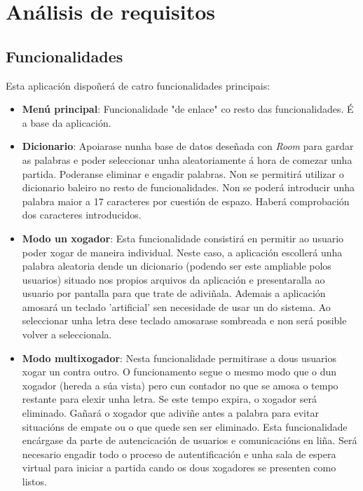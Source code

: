 \chapter{Análisis de requisitos}
\label{chap:requisitos}
\section{Funcionalidades}
Esta aplicación dispoñerá de catro funcionalidades principais:
\begin{itemize}

    \item \textbf{Menú principal}: Funcionalidade "de enlace" co resto das funcionalidades. É a base da aplicación.
    
    \item \textbf{Dicionario}: Apoiarase nunha base de datos deseñada con \textit{Room} para gardar as palabras e poder seleccionar unha aleatoriamente á hora de comezar unha partida. Poderanse eliminar e engadir palabras. Non se permitirá utilizar o dicionario baleiro no resto de funcionalidades. Non se poderá introducir unha palabra maior a 17 caracteres por cuestión de espazo. Haberá comprobación dos caracteres introducidos.
    
    \item \textbf{Modo un xogador}: Esta funcionalidade consistirá en permitir ao usuario poder xogar de maneira individual. Neste caso, a aplicación escollerá unha palabra aleatoria dende un dicionario (podendo ser este ampliable polos usuarios) situado nos propios arquivos da aplicación e presentaralla ao usuario por pantalla para que trate de adiviñala. Ademais a aplicación amosará un teclado 'artificial' sen necesidade de usar un do sistema. Ao seleccionar unha letra dese teclado amosarase sombreada e non será posible volver a seleccionala.
    
    
    \item \textbf{Modo multixogador}: Nesta funcionalidade permitirase a dous usuarios xogar un contra outro. O funcionamento segue o mesmo modo que o dun xogador (hereda a súa vista) pero cun contador no que se amosa o tempo restante para elexir unha letra. Se este tempo expira, o xogador será eliminado. Gañará o xogador que adiviñe antes a palabra para evitar situacións de empate ou o que quede sen ser eliminado. Esta funcionalidade encárgase da parte de autencicación de usuarios e comunicacións en liña. Será necesario engadir todo o proceso de autentificación e unha sala de espera virtual para iniciar a partida cando os dous xogadores se presenten como listos.
    
\end{itemize}
